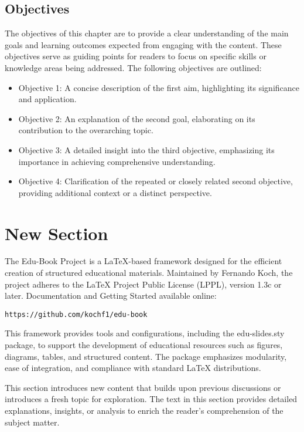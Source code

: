 
\subsection*{Objectives}

The objectives of this chapter are to provide a clear understanding of the main goals and learning outcomes expected from engaging with the content. These objectives serve as guiding points for readers to focus on specific skills or knowledge areas being addressed. The following objectives are outlined:

\begin{itemize}
    \item Objective 1: A concise description of the first aim, highlighting its significance and application.
    \item Objective 2: An explanation of the second goal, elaborating on its contribution to the overarching topic.
    \item Objective 3: A detailed insight into the third objective, emphasizing its importance in achieving comprehensive understanding.
    \item Objective 4: Clarification of the repeated or closely related second objective, providing additional context or a distinct perspective.
\end{itemize}

\section{New Section}

The Edu-Book Project \cite{koch2024a} is a LaTeX-based framework designed for the efficient creation of structured educational materials. Maintained by Fernando Koch, the project adheres to the LaTeX Project Public License (LPPL), version 1.3c or later. Documentation and Getting Started available online:

\begin{verbatim}
https://github.com/kochf1/edu-book
\end{verbatim}

This framework provides tools and configurations, including the edu-slides.sty package, to support the development of educational resources such as figures, diagrams, tables, and structured content. The package emphasizes modularity, ease of integration, and compliance with standard LaTeX distributions.

This section introduces new content that builds upon previous discussions or introduces a fresh topic for exploration. The text in this section provides detailed explanations, insights, or analysis to enrich the reader's comprehension of the subject matter. 

